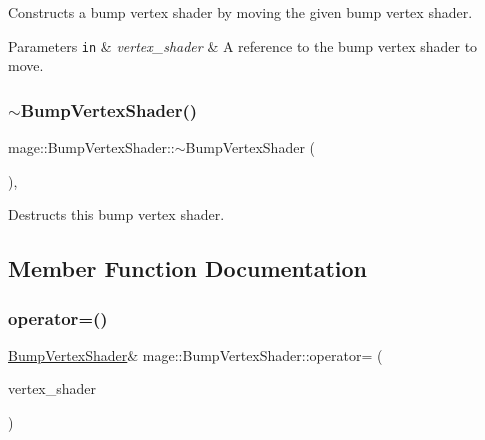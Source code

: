 Constructs a bump vertex shader by moving the given bump vertex shader.


\begin{DoxyParams}[1]{Parameters}
\mbox{\tt in}  & {\em vertex\+\_\+shader} & A reference to the bump vertex shader to move. \\
\hline
\end{DoxyParams}
\hypertarget{classmage_1_1_bump_vertex_shader_aac66d698654ff58a1440cf3dfdcece40}{}\label{classmage_1_1_bump_vertex_shader_aac66d698654ff58a1440cf3dfdcece40} 
\subsubsection{\texorpdfstring{$\sim$\+Bump\+Vertex\+Shader()}{~BumpVertexShader()}}
{\footnotesize\ttfamily mage\+::\+Bump\+Vertex\+Shader\+::$\sim$\+Bump\+Vertex\+Shader (\begin{DoxyParamCaption}{ }\end{DoxyParamCaption})\hspace{0.3cm}{\ttfamily [virtual]}, {\ttfamily [default]}}

Destructs this bump vertex shader. 

\subsection{Member Function Documentation}
\hypertarget{classmage_1_1_bump_vertex_shader_a03d0c6105391a294d8e762d9cac600a8}{}\label{classmage_1_1_bump_vertex_shader_a03d0c6105391a294d8e762d9cac600a8} 
\subsubsection{\texorpdfstring{operator=()}{operator=()}\hspace{0.1cm}{\footnotesize\ttfamily [1/2]}}
{\footnotesize\ttfamily \hyperlink{classmage_1_1_bump_vertex_shader}{Bump\+Vertex\+Shader}\& mage\+::\+Bump\+Vertex\+Shader\+::operator= (\begin{DoxyParamCaption}\item[{const \hyperlink{classmage_1_1_bump_vertex_shader}{Bump\+Vertex\+Shader} \&}]{vertex\+\_\+shader }\end{DoxyParamCaption})\hspace{0.3cm}{\ttfamily [delete]}}

